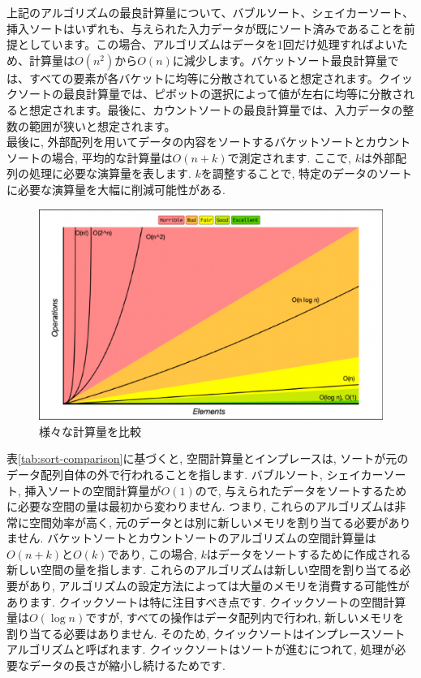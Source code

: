\documentclass[a4j, 12pt]{jarticle}
\begin{document}
上記のアルゴリズムの最良計算量について、バブルソート、シェイカーソート、挿入ソートはいずれも、与えられた入力データが既にソート済みであることを前提としています。この場合、アルゴリズムはデータを1回だけ処理すればよいため、計算量は$O(n^2)$から$O(n)$に減少します。バケットソート最良計算量では、すべての要素が各バケットに均等に分散されていると想定されます。クイックソートの最良計算量では、ピボットの選択によって値が左右に均等に分散されると想定されます。最後に、カウントソートの最良計算量では、入力データの整数の範囲が狭いと想定されます。\\

最後に, 外部配列を用いてデータの内容をソートするバケットソートとカウントソートの場合, 平均的な計算量は$O(n + k)$で測定されます. ここで, $k$は外部配列の処理に必要な演算量を表します. $k$を調整することで, 特定のデータのソートに必要な演算量を大幅に削減可能性がある.\\

\begin{figure}[H]
  \centering
  \includegraphics[width=0.8\linewidth]{bigo.eps}
  \caption{様々な計算量を比較}\label{bigograph}
\end{figure}

表\ref{tab:sort-comparison}に基づくと, 空間計算量とインプレースは, ソートが元のデータ配列自体の外で行われることを指します. バブルソート, シェイカーソート, 挿入ソートの空間計算量が$O(1)$ので, 与えられたデータをソートするために必要な空間の量は最初から変わりません. つまり, これらのアルゴリズムは非常に空間効率が高く, 元のデータとは別に新しいメモリを割り当てる必要がありません. バケットソートとカウントソートのアルゴリズムの空間計算量は$O(n + k)$と$O(k)$であり, この場合, $k$はデータをソートするために作成される新しい空間の量を指します. これらのアルゴリズムは新しい空間を割り当てる必要があり, アルゴリズムの設定方法によっては大量のメモリを消費する可能性があります. クイックソートは特に注目すべき点です. クイックソートの空間計算量は$O(\log n)$ですが, すべての操作はデータ配列内で行われ, 新しいメモリを割り当てる必要はありません. そのため, クイックソートはインプレースソートアルゴリズムと呼ばれます. クイックソートはソートが進むにつれて, 処理が必要なデータの長さが縮小し続けるためです.\\
\end{document}
